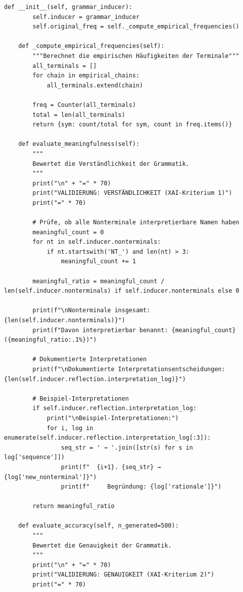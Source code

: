 \documentclass[
  12pt,
  a4paper,
  oneside,
  titlepage
]{article}
\begin{document}
\begin{lstlisting}[caption=Algorithmisch Rekursive Sequenzanalyse 3.0 - Hierarchische Grammatikinduktion]
    def __init__(self, grammar_inducer):
        self.inducer = grammar_inducer
        self.original_freq = self._compute_empirical_frequencies()
        
    def _compute_empirical_frequencies(self):
        """Berechnet die empirischen Häufigkeiten der Terminale"""
        all_terminals = []
        for chain in empirical_chains:
            all_terminals.extend(chain)
        
        freq = Counter(all_terminals)
        total = len(all_terminals)
        return {sym: count/total for sym, count in freq.items()}
    
    def evaluate_meaningfulness(self):
        """
        Bewertet die Verständlichkeit der Grammatik.
        """
        print("\n" + "=" * 70)
        print("VALIDIERUNG: VERSTÄNDLICHKEIT (XAI-Kriterium 1)")
        print("=" * 70)
        
        # Prüfe, ob alle Nonterminale interpretierbare Namen haben
        meaningful_count = 0
        for nt in self.inducer.nonterminals:
            if nt.startswith('NT_') and len(nt) > 3:
                meaningful_count += 1
        
        meaningful_ratio = meaningful_count / len(self.inducer.nonterminals) if self.inducer.nonterminals else 0
        
        print(f"\nNonterminale insgesamt: {len(self.inducer.nonterminals)}")
        print(f"Davon interpretierbar benannt: {meaningful_count} ({meaningful_ratio:.1%})")
        
        # Dokumentierte Interpretationen
        print(f"\nDokumentierte Interpretationsentscheidungen: {len(self.inducer.reflection.interpretation_log)}")
        
        # Beispiel-Interpretationen
        if self.inducer.reflection.interpretation_log:
            print("\nBeispiel-Interpretationen:")
            for i, log in enumerate(self.inducer.reflection.interpretation_log[:3]):
                seq_str = ' → '.join([str(s) for s in log['sequence']])
                print(f"  {i+1}. {seq_str} → {log['new_nonterminal']}")
                print(f"     Begründung: {log['rationale']}")
        
        return meaningful_ratio
    
    def evaluate_accuracy(self, n_generated=500):
        """
        Bewertet die Genauigkeit der Grammatik.
        """
        print("\n" + "=" * 70)
        print("VALIDIERUNG: GENAUIGKEIT (XAI-Kriterium 2)")
        print("=" * 70)
        

\end{lstlisting}
\end{document}
